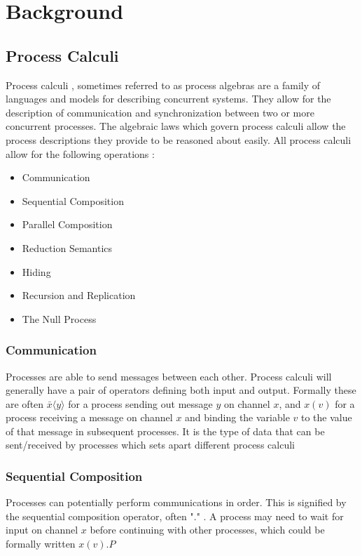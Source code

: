 \section{Background}
\subsection{Process Calculi}

Process calculi , sometimes referred to as process algebras are a family of languages and models for describing concurrent systems. They allow for the description of communication and synchronization between two or more concurrent processes. The algebraic laws which govern process calculi allow the process descriptions they provide to be reasoned about easily.
All process calculi allow for the following operations \cite{wiki:pa}:
\begin{itemize}
    \item Communication
    \item Sequential Composition
    \item Parallel Composition
    \item Reduction Semantics
    \item Hiding 
    \item Recursion and Replication
    \item The Null Process
\end{itemize}
\subsubsection{Communication}
Processes are able to send messages between each other. Process calculi will generally have a pair of operators defining both input and output. Formally these are often $\bar{x}\langle y \rangle$ for a process sending out message $y$ on channel $x$, and $x \left( v \right) $ for a process receiving a message on channel $x$ and binding the variable $v$ to the value of that message in subsequent processes. 
It is the type of data that can be sent/received by processes which sets apart different process calculi
\subsubsection{Sequential Composition}
Processes can potentially perform communications in order. This is signified by the sequential composition operator, often "$.$" . A process may need to wait for input on channel $x$ before continuing with other processes, which could be formally written $x\left( v \right) .P$
